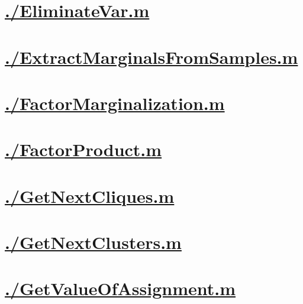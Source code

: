 \documentclass{article}
\begin{document}
    \section{\hyperref[toc]{./EliminateVar.m}}
        \newpage
    \section{\hyperref[toc]{./ExtractMarginalsFromSamples.m}}
        \newpage
    \section{\hyperref[toc]{./FactorMarginalization.m}}
        \newpage
    \section{\hyperref[toc]{./FactorProduct.m}}
        \newpage
    \section{\hyperref[toc]{./GetNextCliques.m}}
        \newpage
    \section{\hyperref[toc]{./GetNextClusters.m}}
        \newpage
    \section{\hyperref[toc]{./GetValueOfAssignment.m}}
        \newpage
\end{document}

